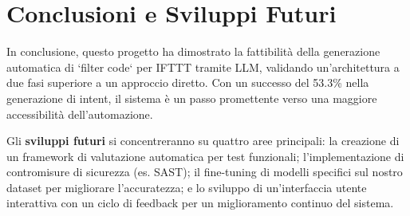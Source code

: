 \documentclass[sigconf,natbib=false]{acmart}
\begin{document}
\section{Conclusioni e Sviluppi Futuri}
In conclusione, questo progetto ha dimostrato la fattibilità della generazione automatica di `filter code` per IFTTT tramite LLM, validando un'architettura a due fasi superiore a un approccio diretto. Con un successo del 53.3\% nella generazione di intent, il sistema è un passo promettente verso una maggiore accessibilità dell'automazione.

Gli \textbf{sviluppi futuri} si concentreranno su quattro aree principali: la creazione di un framework di valutazione automatica per test funzionali; l'implementazione di contromisure di sicurezza (es. SAST); il fine-tuning di modelli specifici sul nostro dataset per migliorare l'accuratezza; e lo sviluppo di un'interfaccia utente interattiva con un ciclo di feedback per un miglioramento continuo del sistema.

\printbibliography
\end{document}
